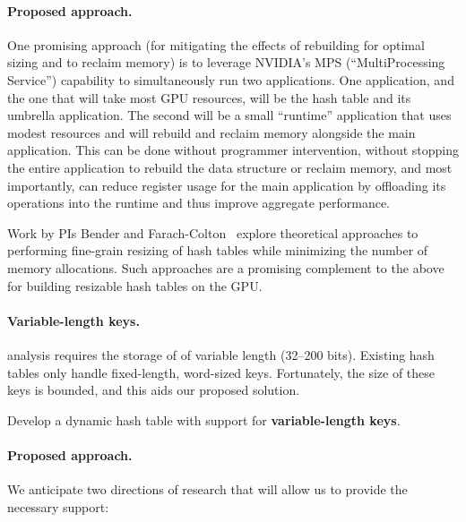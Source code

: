 \paragraph{Proposed approach.}
One promising approach (for mitigating the effects of rebuilding for optimal sizing and to reclaim memory) is to leverage  NVIDIA's MPS (``MultiProcessing Service'') capability to simultaneously run two applications. One application, and the one that will take most GPU resources, will be the hash table and its umbrella application. The second will be a small ``runtime'' application that uses modest resources and will rebuild and reclaim memory alongside the main application. This can be done without programmer intervention, without stopping the entire application to rebuild the data structure or reclaim memory, and most importantly, can reduce register usage for the main application by offloading its operations into the runtime and thus improve aggregate performance.

Work by PIs Bender and Farach-Colton~\cite{BenderCoFa23b,partitionhashing} explore theoretical approaches to performing fine-grain resizing of hash tables while minimizing the number of memory allocations.  Such approaches are a promising complement to the above for building resizable hash tables on the GPU.

\paragraph{Variable-length keys.}
\Kmer analysis requires the storage of \kmers of variable length (32--200 bits). Existing hash tables only handle fixed-length, word-sized keys. Fortunately, the size of these keys is bounded, and this aids our proposed solution.

\begin{rproblem}
  Develop a dynamic hash table with support for \textbf{variable-length keys}.
  \label{rprob:variable-hashtable}
\end{rproblem}



\paragraph{Proposed approach.}
We anticipate two directions of research that will allow us to provide the necessary support:

